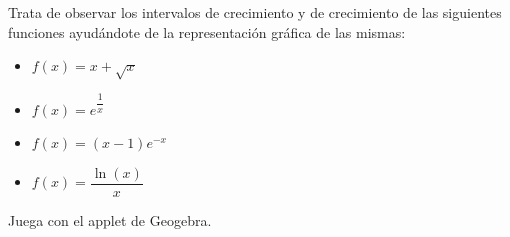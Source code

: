 \vspace{1cm}

\begin{ex}
	Trata de observar los intervalos de crecimiento y de crecimiento de las siguientes funciones ayudándote de la representación gráfica de las mismas:
	\begin{itemize}
		\item $f(x) = x + \sqrt{x}$
		\item $f(x) = e^{\dfrac{1}{x}}$
		\item $f(x) = (x-1)e^{-x}$
		\item $f(x) = \dfrac{\ln(x)}{x}$
	\end{itemize}
	\begin{sol}
		Juega con el applet de Geogebra.
	\end{sol}
\end{ex}
